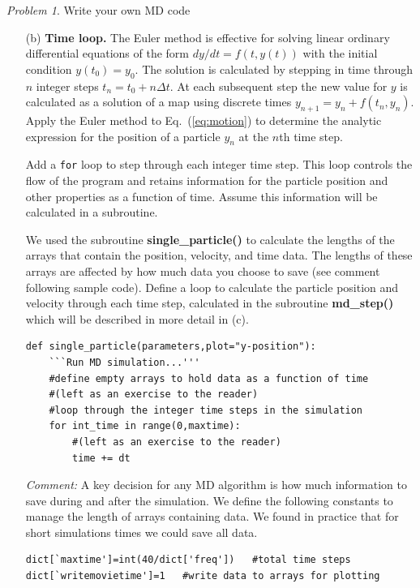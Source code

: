 \documentclass[preprint,showpacs,preprintnumbers,amsmath,amssymb,aps,prb]{revtex4-1}
\theoremstyle{remark}
\newtheorem{problem}{Problem}
\begin{document}
\begin{problem}{Write your own MD code}
\begin{enumerate}
   \item[(b)] {\bf Time loop.}
     The Euler method is effective
     for solving linear ordinary differential  equations
     of the form
     $dy/dt = f(t,y(t))$ with the initial condition $y(t_0) = y_0$.
     The solution is calculated 
     by stepping in time through $n$ integer steps
     $t_n = t_0 + n \Delta t$.
     At each subsequent step the new
     value for $y$ is calculated as a  solution of a map using
     discrete times 
     $y_{n+1} = y_n + f(t_n,y_n)$.
     Apply the Euler method to 
     Eq.~(\ref{eq:motion})
     to determine  the analytic expression
     for the position of a particle
     $y_n$ at the $n$th time step.
  
 \qquad Add a {\tt for} loop
     to step through each integer time step.
     This loop 
     controls
     the flow of the program
     and retains information for the particle position and other
     properties
     as a function of time.
     Assume this information
     will be calculated in a subroutine.
        
\qquad We used the subroutine {\bf single\_particle()}
     to calculate the  lengths of the arrays that contain the 
     position, velocity, and time data.
     The lengths of these arrays are  affected by
     how much data you choose to save
     (see comment following sample code).
     Define a loop to 
     calculate the particle position and velocity through each
       time step,
     calculated in the subroutine {\bf md\_step()}
     which will be described in more detail in (c).
\begin{verbatim}
def single_particle(parameters,plot="y-position"):
    ```Run MD simulation...'''    
    #define empty arrays to hold data as a function of time
    #(left as an exercise to the reader)   
    #loop through the integer time steps in the simulation
    for int_time in range(0,maxtime):
        #(left as an exercise to the reader)
        time += dt
\end{verbatim}

{\it Comment:}     
     A key decision for any MD algorithm
     is how much information to save during and after
     the simulation.
     We define the following constants
     to manage the length of arrays
     containing data.
     We found in practice that for 
     short simulations times
     we could save all data.
\begin{verbatim}
dict[`maxtime']=int(40/dict['freq'])   #total time steps 
dict[`writemovietime']=1   #write data to arrays for plotting
\end{verbatim}


\end{enumerate}
\end{problem}
\end{document}
